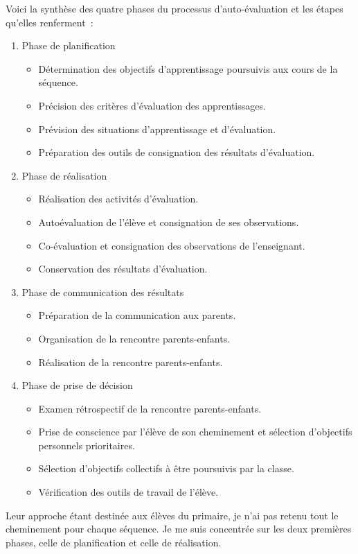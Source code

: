 Voici la synthèse des quatre phases du processus d'auto-évaluation et les étapes qu'elles renferment~:
\begin{enumerate}
\item Phase de planification
	\begin{itemize}
	\item Détermination des objectifs d'apprentissage poursuivis aux cours de la séquence.
	\item Précision des critères d'évaluation des apprentissages.
	\item Prévision des situations d'apprentissage et d'évaluation.
	\item Préparation des outils de consignation des résultats d'évaluation.
	\end{itemize}
\item Phase de réalisation
	\begin{itemize}
	\item Réalisation des activités d'évaluation.
	\item Autoévaluation de l'élève et consignation de ses observations.
	\item Co-évaluation et consignation des observations de l'enseignant.
	\item Conservation des résultats d'évaluation.
	\end{itemize}
\item Phase de communication des résultats
	\begin{itemize}
	\item Préparation de la communication aux parents.
	\item Organisation de la rencontre parents-enfants.
	\item Réalisation de la rencontre parents-enfants.
	\end{itemize}
\item Phase de prise de décision
	\begin{itemize}
	\item Examen rétrospectif de la rencontre parents-enfants.
	\item Prise de conscience par l'élève de son cheminement et sélection d'objectifs personnels prioritaires.
	\item Sélection d'objectifs collectifs à être poursuivis par la classe.
	\item Vérification des outils de travail de l'élève.
	\end{itemize}
\end{enumerate}

Leur approche étant destinée aux élèves du primaire, je n'ai pas retenu tout le cheminement pour chaque séquence.
Je me suis concentrée sur les deux premières phases, celle de planification et celle de réalisation.


